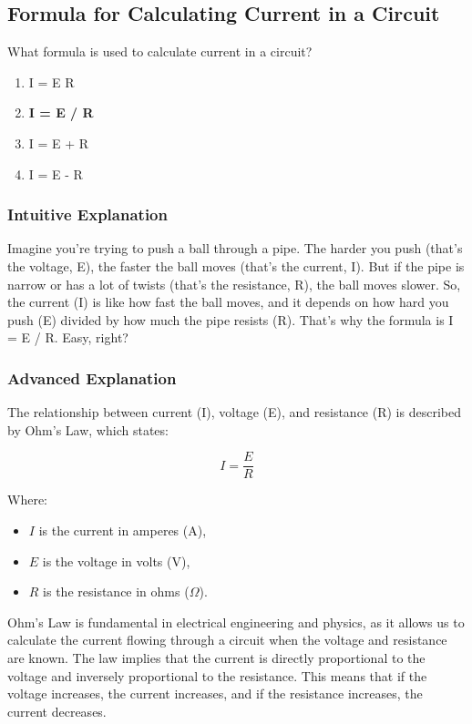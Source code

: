 \subsection{Formula for Calculating Current in a Circuit}
\label{T5D01}

\begin{tcolorbox}[colback=gray!10!white,colframe=black!75!black,title=T5D01]
What formula is used to calculate current in a circuit?
\begin{enumerate}[label=\Alph*)]
    \item I = E R
    \item \textbf{I = E / R}
    \item I = E + R
    \item I = E - R
\end{enumerate}
\end{tcolorbox}

\subsubsection{Intuitive Explanation}
Imagine you're trying to push a ball through a pipe. The harder you push (that's the voltage, E), the faster the ball moves (that's the current, I). But if the pipe is narrow or has a lot of twists (that's the resistance, R), the ball moves slower. So, the current (I) is like how fast the ball moves, and it depends on how hard you push (E) divided by how much the pipe resists (R). That's why the formula is I = E / R. Easy, right?

\subsubsection{Advanced Explanation}
The relationship between current (I), voltage (E), and resistance (R) is described by Ohm's Law, which states:

\[
I = \frac{E}{R}
\]

Where:
\begin{itemize}
    \item \( I \) is the current in amperes (A),
    \item \( E \) is the voltage in volts (V),
    \item \( R \) is the resistance in ohms (\(\Omega\)).
\end{itemize}

Ohm's Law is fundamental in electrical engineering and physics, as it allows us to calculate the current flowing through a circuit when the voltage and resistance are known. The law implies that the current is directly proportional to the voltage and inversely proportional to the resistance. This means that if the voltage increases, the current increases, and if the resistance increases, the current decreases.

